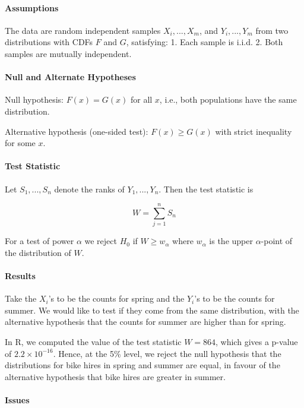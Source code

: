 \paragraph{Assumptions}

The data are random independent samples $X_i, ..., X_m$, and $Y_i, ..., Y_m$ from two distributions with CDFs $F$ and $G$, satisfying:
1. Each sample is i.i.d.
2. Both samples are mutually independent.

\paragraph{Null and Alternate Hypotheses}

Null hypothesis: $F(x) = G(x)$ for all $x$, i.e., both populations have the same distribution.

Alternative hypothesis (one-sided test): $F(x) \geq G(x)$ with strict inequality for some $x$.

\paragraph{Test Statistic} Let $S_1, ..., S_n$ denote the ranks of $Y_1,...,Y_n$. Then the test statistic is

\[W = \sum_{j=1}^{n} S_n \]

For a test of power $\alpha$ we reject $H_0$ if $W \geq w_{\alpha}$ where $w_{\alpha}$ is the upper $\alpha$-point of the distribution of $W$.

\paragraph{Results}

Take  the $X_i$'s to be the counts for spring and the $Y_i$'s to be the counts for summer. We would like to test if they come from the same distribution, with the alternative hypothesis that the counts for summer are higher than for spring.

In R, we computed the value of the test statistic $W = 864$, which gives a p-value of $2.2 \times 10^{-16}$. Hence, at the 5\% level, we reject the null hypothesis that the distributions for bike hires in spring and summer are equal, in favour of the alternative hypothesis that bike hires are greater in summer.

\paragraph{Issues}

